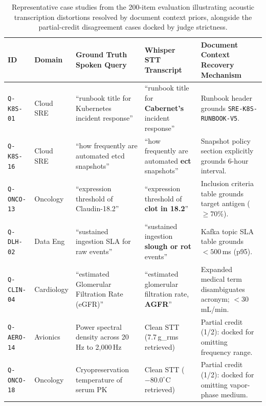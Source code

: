 \begin{table}[t]
\centering
\small
\caption{Representative case studies from the 200-item evaluation illustrating acoustic transcription distortions resolved by document context priors, alongside the partial-credit disagreement cases docked by judge strictness.}
\label{tab:phonetic}
\begin{tabularx}{\textwidth}{lp{2.4cm}p{4.2cm}p{3.8cm}X}
\toprule
\textbf{ID} & \textbf{Domain} & \textbf{Ground Truth Spoken Query} & \textbf{Whisper STT Transcript} & \textbf{Document Context Recovery Mechanism} \\
\midrule
\texttt{Q-K8S-01} & Cloud SRE & ``runbook title for Kubernetes incident response'' & ``runbook title for \textbf{Cabernet's} incident response'' & Runbook header grounds \texttt{SRE-K8S-RUNBOOK-V5}. \\
\texttt{Q-K8S-16} & Cloud SRE & ``how frequently are automated etcd snapshots'' & ``how frequently are automated \textbf{ect} snapshots'' & Snapshot policy section explicitly grounds 6-hour interval. \\
\texttt{Q-ONCO-13} & Oncology & ``expression threshold of Claudin-18.2'' & ``expression threshold of \textbf{clot in 18.2}'' & Inclusion criteria table grounds target antigen ($\ge 70\%$). \\
\texttt{Q-DLH-02} & Data Eng & ``sustained ingestion SLA for raw events'' & ``sustained ingestion \textbf{slough or rot} events'' & Kafka topic SLA table grounds $< 500$\,ms (p95). \\
\texttt{Q-CLIN-04} & Cardiology & ``estimated Glomerular Filtration Rate (eGFR)'' & ``estimated glomerular filtration rate, \textbf{AGFR}'' & Expanded medical term disambiguates acronym; $< 30$\,mL/min. \\
\midrule
\texttt{Q-AERO-14} & Avionics & Power spectral density across 20\,Hz to 2,000\,Hz & Clean STT (7.7\,g\_rms retrieved) & Partial credit (1/2): docked for omitting frequency range. \\
\texttt{Q-ONCO-18} & Oncology & Cryopreservation temperature of serum PK & Clean STT ($-80.0^\circ$C retrieved) & Partial credit (1/2): docked for omitting vapor-phase medium. \\
\bottomrule
\end{tabularx}
\end{table}
